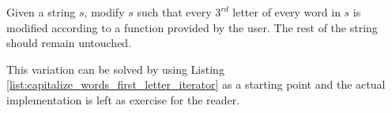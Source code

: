 \begin{exercise}
Given a string $s$, modify $s$ such that every $3^{rd}$ letter of every word in $s$ is modified according to a function provided by the user. The rest of the string should remain untouched.
\end{exercise}

This variation can be solved by using Listing \ref{list:capitalize_words_first_letter_iterator} as a starting point and the actual implementation is left as exercise for the reader.


